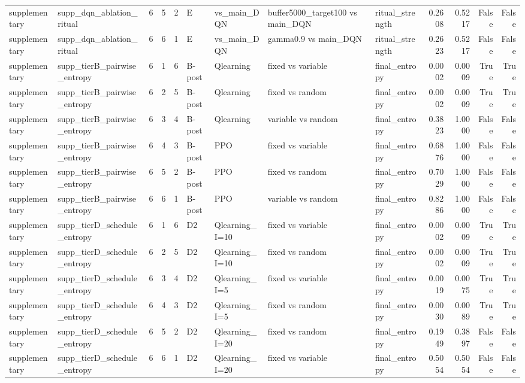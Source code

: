 \begin{tabular}{llrrrllllrrrr}
supplementary & supp_dqn_ablation_ritual & 6 & 5 & 2 & E & vs_main_DQN & buffer5000_target100 vs main_DQN & ritual_strength & 0.2608 & 0.5217 & False & False \\
supplementary & supp_dqn_ablation_ritual & 6 & 6 & 1 & E & vs_main_DQN & gamma0.9 vs main_DQN & ritual_strength & 0.2623 & 0.5217 & False & False \\
supplementary & supp_tierB_pairwise_entropy & 6 & 1 & 6 & B-post & Qlearning & fixed vs variable & final_entropy & 0.0002 & 0.0009 & True & True \\
supplementary & supp_tierB_pairwise_entropy & 6 & 2 & 5 & B-post & Qlearning & fixed vs random & final_entropy & 0.0002 & 0.0009 & True & True \\
supplementary & supp_tierB_pairwise_entropy & 6 & 3 & 4 & B-post & Qlearning & variable vs random & final_entropy & 0.3823 & 1.0000 & False & False \\
supplementary & supp_tierB_pairwise_entropy & 6 & 4 & 3 & B-post & PPO & fixed vs variable & final_entropy & 0.6876 & 1.0000 & False & False \\
supplementary & supp_tierB_pairwise_entropy & 6 & 5 & 2 & B-post & PPO & fixed vs random & final_entropy & 0.7029 & 1.0000 & False & False \\
supplementary & supp_tierB_pairwise_entropy & 6 & 6 & 1 & B-post & PPO & variable vs random & final_entropy & 0.8286 & 1.0000 & False & False \\
supplementary & supp_tierD_schedule_entropy & 6 & 1 & 6 & D2 & Qlearning_I=10 & fixed vs variable & final_entropy & 0.0002 & 0.0009 & True & True \\
supplementary & supp_tierD_schedule_entropy & 6 & 2 & 5 & D2 & Qlearning_I=10 & fixed vs random & final_entropy & 0.0002 & 0.0009 & True & True \\
supplementary & supp_tierD_schedule_entropy & 6 & 3 & 4 & D2 & Qlearning_I=5 & fixed vs variable & final_entropy & 0.0019 & 0.0075 & True & True \\
supplementary & supp_tierD_schedule_entropy & 6 & 4 & 3 & D2 & Qlearning_I=5 & fixed vs random & final_entropy & 0.0030 & 0.0089 & True & True \\
supplementary & supp_tierD_schedule_entropy & 6 & 5 & 2 & D2 & Qlearning_I=20 & fixed vs random & final_entropy & 0.1949 & 0.3897 & False & False \\
supplementary & supp_tierD_schedule_entropy & 6 & 6 & 1 & D2 & Qlearning_I=20 & fixed vs variable & final_entropy & 0.5054 & 0.5054 & False & False \\

\end{tabular}
